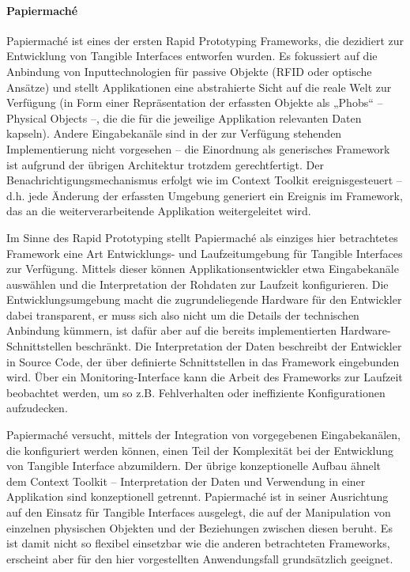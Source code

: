 
\paragraph{Papiermaché} %
\label{par:papiermaché}
Papiermaché \citep{Klemmer04} ist eines der ersten Rapid Prototyping Frameworks, die dezidiert zur Entwicklung von Tangible Interfaces entworfen wurden. Es fokussiert auf die Anbindung von Inputtechnologien für passive Objekte (RFID oder optische Ansätze) und stellt Applikationen eine abstrahierte Sicht auf die reale Welt zur Verfügung (in Form einer Repräsentation der erfassten Objekte als „Phobs“ -- Physical Objects --, die die für die jeweilige Applikation relevanten Daten kapseln). Andere Eingabekanäle sind in der zur Verfügung stehenden Implementierung nicht vorgesehen -- die Einordnung als generisches Framework ist aufgrund der übrigen Architektur trotzdem gerechtfertigt. Der Benachrichtigungsmechanismus erfolgt wie im Context Toolkit ereignisgesteuert -- d.h. jede Änderung der erfassten Umgebung generiert ein Ereignis im Framework, das an die weiterverarbeitende Applikation weitergeleitet wird.

Im Sinne des Rapid Prototyping stellt Papiermaché als einziges hier betrachtetes Framework eine Art Entwicklungs- und Laufzeitumgebung für Tangible Interfaces zur Verfügung. Mittels dieser können Applikationsentwickler etwa Eingabekanäle auswählen und die Interpretation der Rohdaten zur Laufzeit konfigurieren. Die Entwicklungsumgebung macht die zugrundeliegende Hardware für den Entwickler dabei transparent, er muss sich also nicht um die Details der technischen Anbindung kümmern, ist dafür aber auf die bereits implementierten Hardware-Schnittstellen beschränkt. Die Interpretation der Daten beschreibt der Entwickler in Source Code, der über definierte Schnittstellen in das Framework eingebunden wird. Über ein Monitoring-Interface kann die Arbeit des Frameworks zur Laufzeit beobachtet werden, um so z.B. Fehlverhalten oder ineffiziente Konfigurationen aufzudecken.

Papiermaché versucht, mittels der Integration von vorgegebenen Eingabekanälen, die konfiguriert werden können, einen Teil der Komplexität bei der Entwicklung von Tangible Interface abzumildern. Der übrige konzeptionelle Aufbau ähnelt dem Context Toolkit -- Interpretation der Daten und Verwendung in einer Applikation sind konzeptionell getrennt. Papiermaché ist in seiner Ausrichtung auf den Einsatz für Tangible Interfaces ausgelegt, die auf der Manipulation von einzelnen physischen Objekten und der Beziehungen zwischen diesen beruht. Es ist damit nicht so flexibel einsetzbar wie die anderen betrachteten Frameworks, erscheint aber für den hier vorgestellten Anwendungsfall grundsätzlich geeignet.


